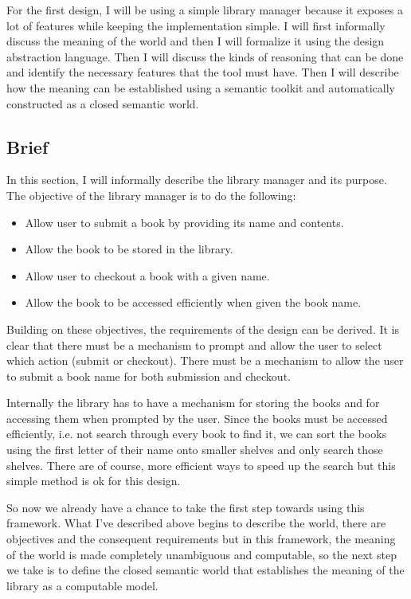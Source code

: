 For the first design, I will be using a simple library manager because it exposes a lot of features while keeping the implementation simple. I will first informally discuss the meaning of the world and then I will formalize it using the design abstraction language. Then I will discuss the kinds of reasoning that can be done and identify the necessary features that the tool must have. Then I will describe how the meaning can be established using a semantic toolkit and automatically constructed as a closed semantic world.

\subsection{Brief}

In this section, I will informally describe the library manager and its purpose. The objective of the library manager is to do the following:

\begin{itemize}
    \item Allow user to submit a book by providing its name and contents.
    \item Allow the book to be stored in the library.
    \item Allow user to checkout a book with a given name.
    \item Allow the book to be accessed efficiently when given the book name.
\end{itemize}

Building on these objectives, the requirements of the design can be derived. It is clear that there must be a mechanism to prompt and allow the user to select which action (submit or checkout). There must be a mechanism to allow the user to submit a book name for both submission and checkout. 

Internally the library has to have a mechanism for storing the books and for accessing them when prompted by the user. Since the books must be accessed efficiently, i.e. not search through every book to find it, we can sort the books using the first letter of their name onto smaller shelves and only search those shelves. There are of course, more efficient ways to speed up the search but this simple method is ok for this design.

So now we already have a chance to take the first step towards using this framework. What I've described above begins to describe the world, there are objectives and the consequent requirements but in this framework, the meaning of the world is made completely unambiguous and computable, so the next step we take is to define the closed semantic world that establishes the meaning of the library as a computable model.

